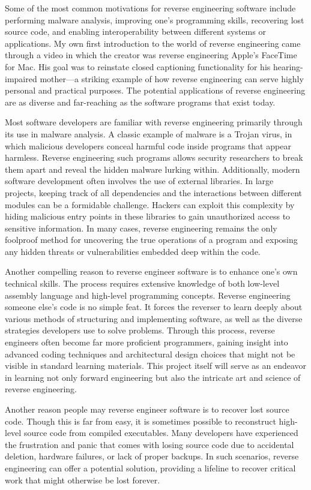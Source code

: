 Some of the most common motivations for reverse engineering software include performing malware analysis, improving one’s programming skills, recovering lost source code, and enabling interoperability between different systems or applications. My own first introduction to the world of reverse engineering came through a video in which the creator was reverse engineering Apple’s FaceTime for Mac. His goal was to reinstate closed captioning functionality for his hearing-impaired mother—a striking example of how reverse engineering can serve highly personal and practical purposes. The potential applications of reverse engineering are as diverse and far-reaching as the software programs that exist today.

Most software developers are familiar with reverse engineering primarily through its use in malware analysis. A classic example of malware is a Trojan virus, in which malicious developers conceal harmful code inside programs that appear harmless. Reverse engineering such programs allows security researchers to break them apart and reveal the hidden malware lurking within. Additionally, modern software development often involves the use of external libraries. In large projects, keeping track of all dependencies and the interactions between different modules can be a formidable challenge. Hackers can exploit this complexity by hiding malicious entry points in these libraries to gain unauthorized access to sensitive information. In many cases, reverse engineering remains the only foolproof method for uncovering the true operations of a program and exposing any hidden threats or vulnerabilities embedded deep within the code.

Another compelling reason to reverse engineer software is to enhance one’s own technical skills. The process requires extensive knowledge of both low-level assembly language and high-level programming concepts. Reverse engineering someone else’s code is no simple feat. It forces the reverser to learn deeply about various methods of structuring and implementing software, as well as the diverse strategies developers use to solve problems. Through this process, reverse engineers often become far more proficient programmers, gaining insight into advanced coding techniques and architectural design choices that might not be visible in standard learning materials. This project itself will serve as an endeavor in learning not only forward engineering but also the intricate art and science of reverse engineering.

Another reason people may reverse engineer software is to recover lost source code. Though this is far from easy, it is sometimes possible to reconstruct high-level source code from compiled executables. Many developers have experienced the frustration and panic that comes with losing source code due to accidental deletion, hardware failures, or lack of proper backups. In such scenarios, reverse engineering can offer a potential solution, providing a lifeline to recover critical work that might otherwise be lost forever.

